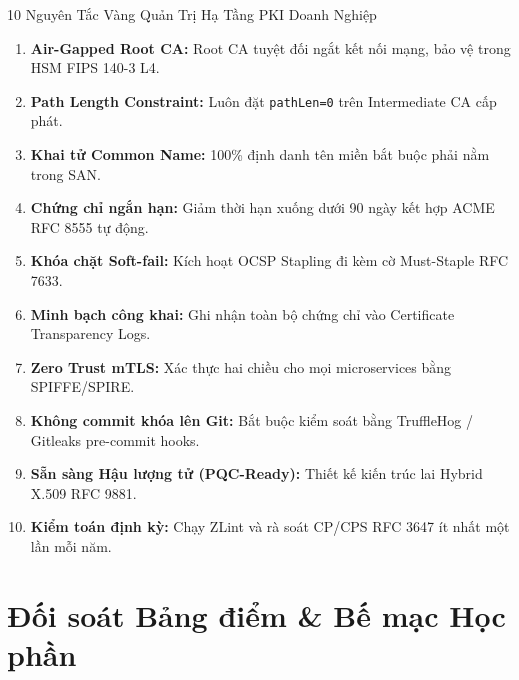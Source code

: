 \begin{frame}{10 Nguyên Tắc Vàng Quản Trị Hạ Tầng PKI Doanh Nghiệp}
  \begin{enumerate}\footnotesize
    \item \textbf{Air-Gapped Root CA:} Root CA tuyệt đối ngắt kết nối mạng, bảo vệ trong HSM FIPS 140-3 L4.
    \item \textbf{Path Length Constraint:} Luôn đặt \texttt{pathLen=0} trên Intermediate CA cấp phát.
    \item \textbf{Khai tử Common Name:} 100\% định danh tên miền bắt buộc phải nằm trong SAN.
    \item \textbf{Chứng chỉ ngắn hạn:} Giảm thời hạn xuống dưới 90 ngày kết hợp ACME RFC 8555 tự động.
    \item \textbf{Khóa chặt Soft-fail:} Kích hoạt OCSP Stapling đi kèm cờ Must-Staple RFC 7633.
    \item \textbf{Minh bạch công khai:} Ghi nhận toàn bộ chứng chỉ vào Certificate Transparency Logs.
    \item \textbf{Zero Trust mTLS:} Xác thực hai chiều cho mọi microservices bằng SPIFFE/SPIRE.
    \item \textbf{Không commit khóa lên Git:} Bắt buộc kiểm soát bằng TruffleHog / Gitleaks pre-commit hooks.
    \item \textbf{Sẵn sàng Hậu lượng tử (PQC-Ready):} Thiết kế kiến trúc lai Hybrid X.509 RFC 9881.
    \item \textbf{Kiểm toán định kỳ:} Chạy ZLint và rà soát CP/CPS RFC 3647 ít nhất một lần mỗi năm.
  \end{enumerate}
\end{frame}

\section{Đối soát Bảng điểm \& Bế mạc Học phần}

